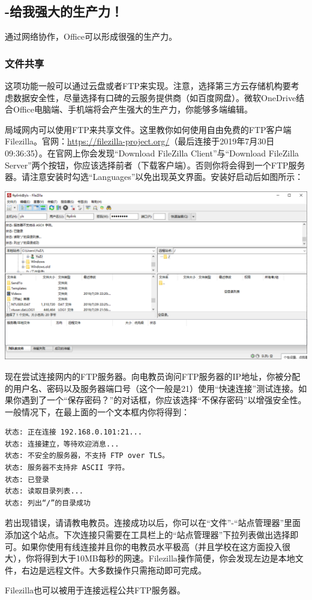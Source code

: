\subsection{-给我强大的生产力！}
\label{sec:OneDrive}通过网络协作，Office可以形成很强的生产力。
\subsubsection{文件共享}
这项功能一般可以通过云盘或者FTP来实现。注意，选择第三方云存储机构要考虑数据安全性，尽量选择有口碑的云服务提供商（如百度网盘）。微软OneDrive结合Office电脑端、手机端将会产生强大的生产力，你能够多端编辑。\par
局域网内可以使用FTP来共享文件。这里教你如何使用自由免费的FTP客户端Filezilla。官网：\url{https://filezilla-project.org/}（最后连接于2019年7月30日09:36:35）。在官网上你会发现“Download FileZilla Client”与“Download FileZilla Server”两个按钮，你应该选择前者（下载客户端）。否则你将会得到一个FTP服务器。请注意安装时勾选“Languages”以免出现英文界面。安装好启动后如图所示：\par
\begin{center}
	\includegraphics[scale=0.5]{pic/fz}
\end{center} \par
现在尝试连接网内的FTP服务器。向电教员询问FTP服务器的IP地址，你被分配的用户名、密码以及服务器端口号（这个一般是21）使用“快速连接”测试连接。如果你遇到了一个“保存密码？”的对话框，你应该选择“不保存密码”以增强安全性。一般情况下，在最上面的一个文本框内你将得到：
\begin{verbatim}
状态:	正在连接 192.168.0.101:21...
状态:	连接建立，等待欢迎消息...
状态:	不安全的服务器，不支持 FTP over TLS。
状态:	服务器不支持非 ASCII 字符。
状态:	已登录
状态:	读取目录列表...
状态:	列出“/”的目录成功
\end{verbatim}
若出现错误，请请教电教员。连接成功以后，你可以在“文件”-“站点管理器”里面添加这个站点。下次连接只需要在工具栏上的“站点管理器”下拉列表做出选择即可。如果你使用有线连接并且你的电教员水平极高（并且学校在这方面投入很大），你将得到大于10MB每秒的网速。Filezilla操作简便，你会发现左边是本地文件，右边是远程文件。大多数操作只需拖动即可完成。\par
Filezilla也可以被用于连接远程公共FTP服务器。
